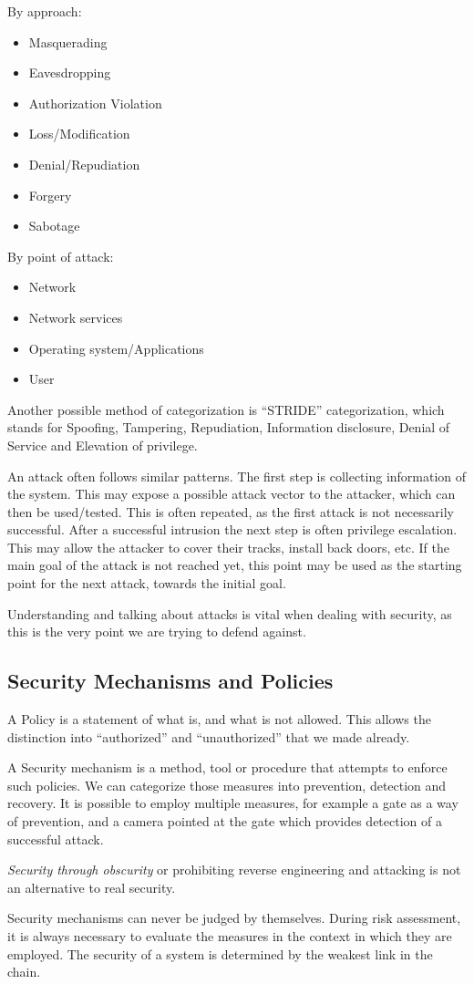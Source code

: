 By approach:
\begin{itemize}
    \item Masquerading
    \item Eavesdropping
    \item Authorization Violation
    \item Loss/Modification
    \item Denial/Repudiation
    \item Forgery
    \item Sabotage
\end{itemize}

By point of attack:
\begin{itemize}
    \item Network
    \item Network services
    \item Operating system/Applications
    \item User
\end{itemize}

Another possible method of categorization is ``STRIDE'' categorization, which
stands for Spoofing, Tampering, Repudiation, Information disclosure, Denial of
Service and Elevation of privilege.

An attack often follows similar patterns. The first step is collecting
information of the system. This may expose a possible attack vector to the
attacker, which can then be used/tested. This is often repeated, as the first
attack is not necessarily successful. After a successful intrusion the next step
is often privilege escalation. This may allow the attacker to cover their
tracks, install back doors, etc. If the main goal of the attack is not reached
yet, this point may be used as the starting point for the next attack, towards
the initial goal.

Understanding and talking about attacks is vital when dealing with security, as
this is the very point we are trying to defend against.

\subsection{Security Mechanisms and Policies}
A Policy is a statement of what is, and what is not allowed. This allows the
distinction into ``authorized'' and ``unauthorized'' that we made already.

A Security mechanism is a method, tool or procedure that attempts to enforce
such policies. We can categorize those measures into prevention, detection and
recovery. It is possible to employ multiple measures, for example a gate as a
way of prevention, and a camera pointed at the gate which provides detection of
a successful attack.

\emph{Security through obscurity} or prohibiting reverse engineering and
attacking is not an alternative to real security.

Security mechanisms can never be judged by themselves. During risk assessment,
it is always necessary to evaluate the measures in the context in which they are
employed. The security of a system is determined by the weakest link in the
chain.
